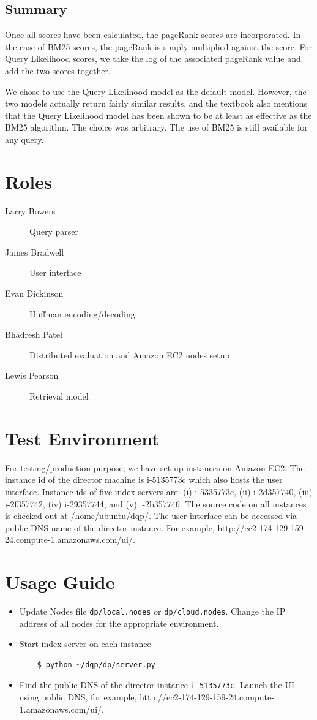 \documentclass[letterpaper,11pt,twoside]{article}
\begin{document}
\subsection{Summary}
Once all scores have been calculated, the pageRank scores are incorporated. In the case of BM25 scores, the pageRank is simply multiplied against the score. For Query Likelihood scores, we take the log of the associated pageRank value and add the two scores together.

We chose to use the Query Likelihood model as the default model. However, the two models actually return fairly similar results, and the textbook also mentions that the Query Likelihood model has been shown to be at least as effective as the BM25 algorithm. The choice was arbitrary. The use of BM25 is still available for any query.

\section{Roles}
\begin{description}
  \item[Larry Bowers] Query parser
  \item[James Bradwell] User interface
  \item[Evan Dickinson] Huffman encoding/decoding 
  \item[Bhadresh Patel] Distributed evaluation and Amazon EC2 nodes setup
  \item[Lewis Pearson] Retrieval model
\end{description}

\section{Test Environment}

For testing/production purpose, we have set up instances on Amazon EC2. The instance id of the director machine is i-5135773c which also hosts the user interface. Instance ids of five index servers are: (i) i-5335773e, (ii) i-2d357740, (iii) i-2f357742, (iv) i-29357744, and (v) i-2b357746. The source code on all instances is checked out at /home/ubuntu/dqp/. The user interface can be accessed via public DNS name of the director instance. For example, http://ec2-174-129-159-24.compute-1.amazonaws.com/ui/.

\section{Usage Guide}

\begin{itemize}
	\item Update Nodes file \texttt{dp/local.nodes} or \texttt{dp/cloud.nodes}. Change the IP address of all nodes for the appropriate environment.
	\item Start index server on each instance
\begin{verbatim}
	$ python ~/dqp/dp/server.py
\end{verbatim}
	\item Find the public DNS of the director instance \texttt{i-5135773c}. Launch the UI using public DNS, for example, http://ec2-174-129-159-24.compute-1.amazonaws.com/ui/.
\end{itemize}
\end{document}
